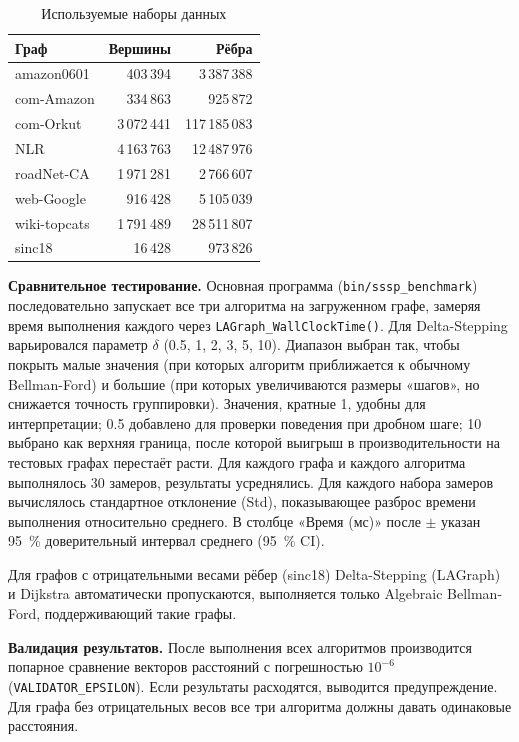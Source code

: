 \documentclass[a4paper]{article}
\begin{document}
\begin{table}[h!]
    \centering
    \caption{Используемые наборы данных}
    \label{tab:datasets}
    \begin{tabular}{lrr}
        \toprule
        \textbf{Граф} & \textbf{Вершины} & \textbf{Рёбра} \\
        \midrule
        amazon0601   & 403\,394  & 3\,387\,388  \\
        com-Amazon   & 334\,863  &   925\,872  \\
        com-Orkut    & 3\,072\,441 & 117\,185\,083 \\
        NLR          & 4\,163\,763 & 12\,487\,976 \\
        roadNet-CA   & 1\,971\,281 & 2\,766\,607  \\
        web-Google   & 916\,428  & 5\,105\,039  \\
        wiki-topcats & 1\,791\,489 & 28\,511\,807 \\
        sinc18       & 16\,428   & 973\,826     \\
        \bottomrule
    \end{tabular}
\end{table}

\textbf{Сравнительное тестирование.} Основная программа (\texttt{bin/sssp\_benchmark}) последовательно
запускает все три алгоритма на загруженном графе, замеряя время выполнения каждого
через \texttt{LAGraph\_WallClockTime()}. Для Delta-Stepping варьировался параметр $\delta$
(0.5, 1, 2, 3, 5, 10). Диапазон выбран так, чтобы покрыть малые значения
(при которых алгоритм приближается к обычному Bellman-Ford) и большие
(при которых увеличиваются размеры «шагов», но снижается точность группировки).
Значения, кратные 1, удобны для интерпретации; 0.5 добавлено для проверки
поведения при дробном шаге; 10 выбрано как верхняя граница, после которой
выигрыш в производительности на тестовых графах перестаёт расти.
Для каждого графа и каждого алгоритма выполнялось 30 замеров, результаты
усреднялись. Для каждого набора замеров вычислялось стандартное отклонение
(Std), показывающее разброс времени выполнения относительно среднего.
В столбце «Время (мс)» после $\pm$ указан 95~\% доверительный интервал
среднего (95~\% CI).

Для графов с отрицательными весами рёбер (sinc18) Delta-Stepping (LAGraph) и Dijkstra
автоматически пропускаются, выполняется только Algebraic Bellman-Ford,
поддерживающий такие графы.

\textbf{Валидация результатов.} После выполнения всех алгоритмов производится
попарное сравнение векторов расстояний с погрешностью $10^{-6}$
(\texttt{VALIDATOR\_EPSILON}). Если результаты расходятся, выводится
предупреждение. Для графа без отрицательных весов все три алгоритма должны
давать одинаковые расстояния.
\end{document}
